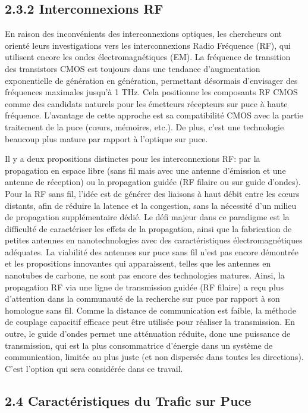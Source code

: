 \subsection*{2.3.2 Interconnexions RF}

En raison des inconvénients des interconnexions optiques, les chercheurs ont orienté leurs investigations vers les interconnexions Radio Fréquence (RF), qui utilisent encore les ondes électromagnétiques (EM). La fréquence de transition des transistors CMOS est toujours dans une tendance d'augmentation exponentielle de génération en génération, permettant désormais d’envisager des fréquences maximales jusqu'à 1 THz. Cela positionne les composants RF CMOS comme des candidats naturels pour les émetteurs récepteurs sur puce à haute fréquence. L'avantage de cette approche est sa compatibilité CMOS avec la partie traitement de la puce (cœurs, mémoires, etc.). De plus, c’est une technologie beaucoup plus mature par rapport à l'optique sur puce.

Il y a deux propositions distinctes pour les interconnexions RF: par la propagation en espace libre (sans fil mais avec une antenne d’émission et une antenne de réception) ou la propagation guidée (RF filaire ou sur guide d'ondes). Pour la RF sans fil, l'idée est de générer des liaisons à haut débit entre les cœurs distants, afin de réduire la latence et la congestion, sans la nécessité d'un milieu de propagation supplémentaire dédié. Le défi majeur dans ce paradigme est la difficulté de caractériser les effets de la propagation, ainsi que la fabrication de petites antennes en nanotechnologies avec des caractéristiques électromagnétiques adéquates. La viabilité des antennes sur puce sans fil n’est pas encore démontrée et les propositions innovantes qui apparaissent, telles que les antennes en nanotubes de carbone, ne sont pas encore des technologies matures. Ainsi, la propagation RF via une ligne de transmission guidée (RF filaire) a reçu plus d'attention dans la communauté de la recherche sur puce par rapport à son homologue sans fil. Comme la distance de communication est faible, la méthode de couplage capacitif efficace peut être utilisée pour réaliser la transmission. En outre, le guide d'ondes permet une atténuation réduite, donc une puissance de transmission, qui est la plus consommatrice d’énergie dans un système de communication, limitée au plus juste (et non dispersée dans toutes les directions). C'est l'option qui sera considérée dans ce travail. 

\subsection*{2.4 Caractéristiques du Trafic sur Puce}

